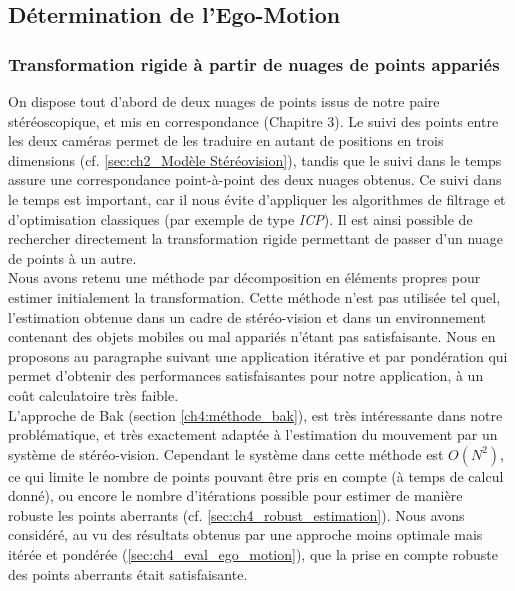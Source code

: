 \subsection{Détermination de l'Ego-Motion}
\subsubsection{Transformation rigide à partir de nuages de points appariés} \label{sec:ch4_ego_motion}

On dispose tout d'abord de deux nuages de points issus de notre paire stéréoscopique, et mis en correspondance (Chapitre 3). Le suivi des points entre les deux caméras permet de les traduire en autant de positions en trois dimensions (cf. \ref{sec:ch2_Modèle Stéréovision}), tandis que le suivi dans le temps assure une correspondance point-à-point des deux nuages obtenus. Ce suivi dans le temps est important, car il nous évite d'appliquer les algorithmes de filtrage et d'optimisation classiques (par exemple de type \textit{ICP}). Il est ainsi possible de rechercher directement la transformation rigide permettant de passer d'un nuage de points à un autre.\\
Nous avons retenu une méthode par décomposition en éléments propres pour estimer initialement la transformation. Cette méthode n'est pas utilisée tel quel, l'estimation obtenue dans un cadre de stéréo-vision et dans un environnement contenant des objets mobiles ou mal appariés n'étant pas satisfaisante. Nous en proposons au paragraphe suivant une application itérative et par pondération qui permet d'obtenir des performances satisfaisantes pour notre application, à un coût calculatoire très faible.\\

L'approche de Bak (section \ref{ch4:méthode_bak}), est très intéressante dans notre problématique, et très exactement adaptée à l'estimation du mouvement par un système de stéréo-vision. Cependant le système dans cette méthode est $O(N^2)$, ce qui limite le nombre de points pouvant être pris en compte (à temps de calcul donné), ou encore le nombre d'itérations possible pour estimer de manière robuste les points aberrants (cf. \ref{sec:ch4_robust_estimation}). Nous avons considéré, au vu des résultats obtenus par une approche moins optimale mais itérée et pondérée (\ref{sec:ch4_eval_ego_motion}), que la prise en compte robuste des points aberrants était satisfaisante.


